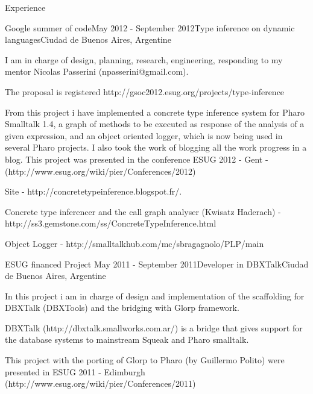 \documentclass{resume} %
\begin{document}
\begin{rSection}{Experience}
\begin{rSubsection}{Google summer of code}{May 2012 - September 2012}{Type inference on dynamic languages}{Ciudad de Buenos Aires, Argentine}
\item I am in charge of design, planning, research, engineering, responding to my mentor Nicolas Passerini (npasserini@gmail.com). 
\item The proposal is registered http://gsoc2012.esug.org/projects/type-inference 
\item From this project i have implemented a concrete type inference system for Pharo Smalltalk 1.4, a graph of methods to be executed as response of the analysis of a given expression,  and an object oriented logger, which is now being used in several Pharo projects. I also took the work of blogging all the work progress in a blog. This project was presented in the conference ESUG 2012 - Gent - (http://www.esug.org/wiki/pier/Conferences/2012) 
\item Site - http://concretetypeinference.blogspot.fr/. 
\item Concrete type inferencer and the call graph analyser (Kwisatz Haderach) - http://ss3.gemstone.com/ss/ConcreteTypeInference.html
\item Object Logger - http://smalltalkhub.com/mc/sbragagnolo/PLP/main
\end{rSubsection}

 
\begin{rSubsection}{ESUG financed Project}{ May 2011 - September 2011}{Developer in DBXTalk}{Ciudad de Buenos Aires, Argentine}
\item In this project i am in charge of design and implementation of the scaffolding for DBXTalk (DBXTools) and the bridging with Glorp framework.
\item DBXTalk (http://dbxtalk.smallworks.com.ar/) is a bridge that gives support for the  database systems to mainstream Squeak and Pharo smalltalk. 
\item This project with the porting of Glorp to Pharo (by Guillermo Polito) were presented in ESUG 2011 - Edimburgh (http://www.esug.org/wiki/pier/Conferences/2011)
\end{rSubsection}



\end{rSection}
\end{document}
